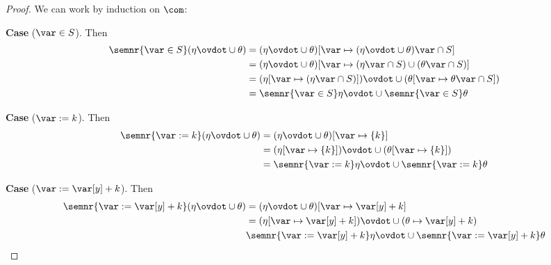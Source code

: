 \begin{proof}
  We can work by induction on \(\com\):

  \medskip
  
  \noindent
  \textbf{Case}  (\(\var \in S\)).
  Then
  \begin{align*}
    \semnr{\var \in S}(\eta \ovdot\cup \theta) & = (\eta \ovdot\cup \theta)[\var \mapsto (\eta \ovdot\cup \theta)\var \cap S] \\
                                           & = (\eta \ovdot\cup \theta)[\var \mapsto (\eta\var \cap S) \cup (\theta\var \cap S)] \\
                                           & = (\eta[\var \mapsto (\eta\var \cap S)]) \ovdot\cup (\theta[\var \mapsto \theta\var \cap S]) \\
                                           & = \semnr{\var \in S}\eta \ovdot\cup \semnr{\var \in S}\theta
  \end{align*}
    
  \medskip

  \noindent
  \textbf{Case}  (\(\var := k\)).
  Then
  \begin{align*}
    \semnr{\var := k}(\eta \ovdot\cup \theta) & = (\eta \ovdot\cup \theta)[\var \mapsto \{k\}] \\
                                          & = (\eta[\var \mapsto \{k\}]) \ovdot\cup (\theta[\var \mapsto \{k\}]) \\
                                          & = \semnr{\var := k}\eta \ovdot\cup \semnr{\var := k}\theta
  \end{align*}

  \medskip

  \noindent
  \textbf{Case}  (\(\var := \var[y] + k\)).
  Then
  \begin{align*}
    \semnr{\var := \var[y] + k}(\eta \ovdot\cup \theta) & = (\eta \ovdot\cup \theta)[\var \mapsto \var[y] + k] \\
                                                    & = (\eta[\var \mapsto \var[y] + k]) \ovdot\cup (\theta \mapsto \var[y] + k) \\
                                                    & \semnr{\var := \var[y] + k}\eta \ovdot\cup \semnr{\var := \var[y] + k}\theta
  \end{align*}


\end{proof}
